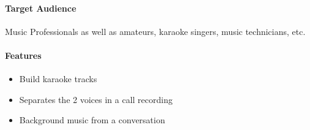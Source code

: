 \documentclass{article}
\begin{document}
\paragraph{Target Audience}
Music Professionals as well as amateurs, karaoke singers, music technicians, etc.
\paragraph{Features}
\begin{itemize}
    \item Build karaoke tracks
    \item Separates the 2 voices in a call recording
    \item Background music from a conversation
\end{itemize}

\vspace{1cm}

  
\end{document}
